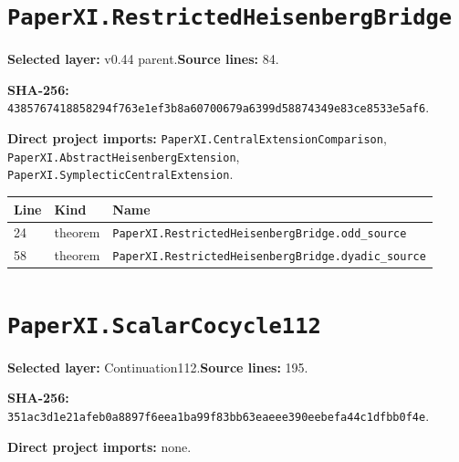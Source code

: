 \documentclass[10pt,oneside]{book}
\begin{document}
\section{\texorpdfstring{\nolinkurl{PaperXI.RestrictedHeisenbergBridge}}{PaperXI.RestrictedHeisenbergBridge}}\label{module:PaperXI.RestrictedHeisenbergBridge}

\textbf{Selected layer:} v0.44 parent.\quad\textbf{Source lines:} 84.\par\textbf{SHA-256:} {\scriptsize\nolinkurl{4385767418858294f763e1ef3b8a60700679a6399d58874349e83ce8533e5af6}}.


\textbf{Direct project imports:} \nolinkurl{PaperXI.CentralExtensionComparison}, \nolinkurl{PaperXI.AbstractHeisenbergExtension}, \nolinkurl{PaperXI.SymplecticCentralExtension}.

\begin{longtable}{@{}p{}p{}p{}@{}}\toprule Line&Kind&Name\\\midrule\endhead

24&theorem&\nolinkurl{PaperXI.RestrictedHeisenbergBridge.odd_source}\\

58&theorem&\nolinkurl{PaperXI.RestrictedHeisenbergBridge.dyadic_source}\\

\bottomrule\end{longtable}

\section{\texorpdfstring{\nolinkurl{PaperXI.ScalarCocycle112}}{PaperXI.ScalarCocycle112}}\label{module:PaperXI.ScalarCocycle112}

\textbf{Selected layer:} Continuation112.\quad\textbf{Source lines:} 195.\par\textbf{SHA-256:} {\scriptsize\nolinkurl{351ac3d1e21afeb0a8897f6eea1ba99f83bb63eaeee390eebefa44c1dfbb0f4e}}.


\textbf{Direct project imports:} none.
\end{document}
